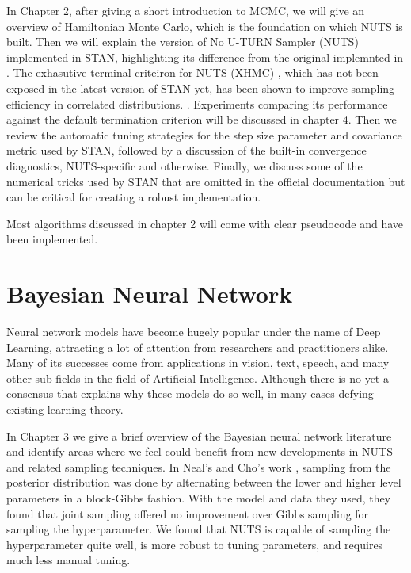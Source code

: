 \documentclass[12pt]{report}
\begin{document}
In Chapter 2, after giving a short introduction to MCMC, we will give an overview of Hamiltonian Monte Carlo, which is the foundation on which NUTS is built. Then we will explain the version of No U-TURN Sampler (NUTS) implemented in STAN, highlighting its difference from the original implemnted in \cite{hoffman2014no}. The exhasutive terminal criteiron for NUTS (XHMC) , which has not been exposed in the latest version of STAN yet, has been shown to improve sampling efficiency in correlated distributions.  \cite{betancourt2016identifying}. Experiments comparing its performance against the default termination criterion will be discussed in chapter 4. Then we review the automatic tuning strategies for the step size parameter and covariance metric used by STAN, followed by a discussion of the built-in convergence diagnostics, NUTS-specific and otherwise.
Finally, we discuss some of the numerical tricks used by STAN that are omitted in the official documentation but can be critical for creating a robust implementation. 

Most algorithms discussed in chapter 2 will come with clear pseudocode and have been implemented. 






\section{Bayesian Neural Network }

Neural network models have become hugely popular under the name of Deep Learning, attracting a lot of attention from researchers and practitioners alike. Many of its successes come from applications in vision, text, speech, and many other sub-fields in the field of Artificial Intelligence. Although there is no yet a consensus that explains why these models do so well, in many cases defying existing learning theory. 


In Chapter 3 we give a brief overview of the Bayesian neural network literature and identify areas where we feel could benefit from new developments in NUTS and related sampling techniques. In Neal's and Cho's work \cite{neal1993bayesian,choo2000learning}, sampling from the posterior distribution was done by alternating between the lower and higher level parameters in a block-Gibbs fashion. With the model and data they used, they found that joint sampling offered no improvement over Gibbs sampling for sampling the hyperparameter. We found that NUTS is capable of sampling the hyperparameter quite well, is more robust to tuning parameters, and requires much less manual tuning. 
\end{document}
